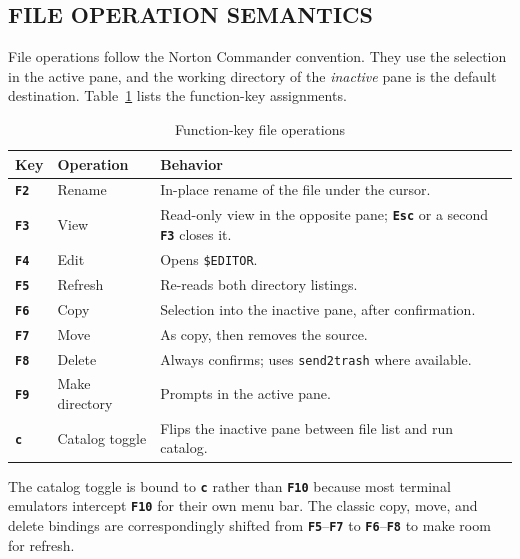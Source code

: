 \documentclass[tm]{ornltm}
\newcommand{\key}[1]{\textbf{\texttt{#1}}}
\begin{document}
\subsection{FILE OPERATION SEMANTICS}

File operations follow the Norton Commander convention. They use the selection
in the active pane, and the working directory of the \emph{inactive} pane is the
default destination. Table~\ref{tab:fkeys} lists the function-key assignments.

\begin{table}[ht]
  \centering
  \begin{threeparttable}
  \caption{Function-key file operations}
  \label{tab:fkeys}
  \small
  \begin{tabular}{l l p{}}
    \toprule
    Key & Operation & Behavior \\
    \midrule
    \key{F2} & Rename & In-place rename of the file under the cursor. \\
    \key{F3} & View & Read-only view in the opposite pane; \key{Esc} or a
      second \key{F3} closes it. \\
    \key{F4} & Edit & Opens \texttt{\$EDITOR}. \\
    \key{F5} & Refresh & Re-reads both directory listings. \\
    \key{F6} & Copy & Selection into the inactive pane, after confirmation. \\
    \key{F7} & Move & As copy, then removes the source. \\
    \key{F8} & Delete & Always confirms; uses \texttt{send2trash} where
      available. \\
    \key{F9} & Make directory & Prompts in the active pane. \\
    \key{c} & Catalog toggle & Flips the inactive pane between file list and run
      catalog.\tnote{a} \\
    \bottomrule
  \end{tabular}
  \begin{tablenotes}
    \item[a] The catalog toggle is bound to \key{c} rather than \key{F10}
    because most terminal emulators intercept \key{F10} for their own menu bar.
    The classic copy, move, and delete bindings are correspondingly shifted from
    \key{F5}--\key{F7} to \key{F6}--\key{F8} to make room for refresh.
  \end{tablenotes}
  \end{threeparttable}
\end{table}
\end{document}
